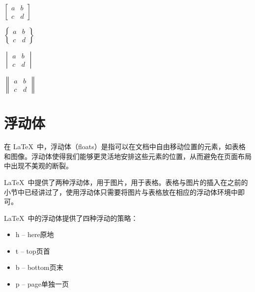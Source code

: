 {\begin{texlst}
\begin{math}
\begin{bmatrix}
	a & b \\
	c & d
\end{bmatrix}
\end{math}
\end{texlst}

\begin{texlst}
\begin{math}
\begin{Bmatrix}
	a & b \\
	c & d
\end{Bmatrix}
\end{math}
\end{texlst}

\begin{texlst}
\begin{math}
\begin{vmatrix}
	a & b \\
	c & d
\end{vmatrix}
\end{math}
\end{texlst}

\begin{texlst}
\begin{math}
\begin{Vmatrix}
	a & b \\
	c & d
\end{Vmatrix}
\end{math}
\end{texlst}

\section{浮动体}
在 \LaTeX\ 中，浮动体（floats）是指可以在文档中自由移动位置的元素，如表格和图像。浮动体使得我们能够更灵活地安排这些元素的位置，从而避免在页面布局中出现不美观的断裂。

\LaTeX\ 中提供了两种浮动体，用于图片，用于表格。表格与图片的插入在之前的小节中已经讲过了，使用浮动体只需要将图片与表格放在相应的浮动体环境中即可。

\LaTeX\  中的浮动体提供了四种浮动的策略：
\begin{itemize}
	\item h -- here原地
	\item t -- top页首
	\item b -- bottom页末
	\item p -- page单独一页
\end{itemize}

}
